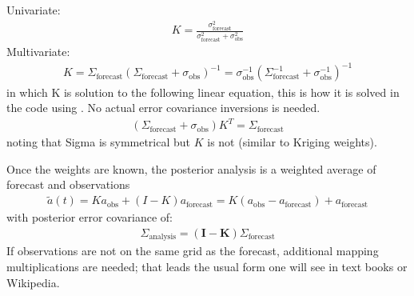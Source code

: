 \documentclass[letterpaper,10pt,english]{sphinxmanual}
\begin{document}
\sphinxAtStartPar
Univariate:
\begin{equation*}
\begin{split}K = \frac{\sigma_{\text{forecast}}^2 } { \sigma_{\text{forecast}}^2 + \sigma_{\text{obs}}^2}\end{split}
\end{equation*}
\sphinxAtStartPar
Multi\sphinxhyphen{}variate:
\begin{equation*}
\begin{split}K = \Sigma_{\text{forecast}} (\Sigma_{\text{forecast}} + \sigma_{\text{obs}})^{-1} =
\sigma_{\text{obs}}^{-1} (\Sigma_{\text{forecast}}^{-1} + \sigma_{\text{obs}}^{-1})^{-1}\end{split}
\end{equation*}
\sphinxAtStartPar
in which K is solution to the following linear equation, this is how it is solved in the code using
. No actual error covariance inversions is needed.
\begin{equation*}
\begin{split}(\Sigma_{\text{forecast}} + \sigma_{\text{obs}}) K^{T} = \Sigma_{\text{forecast}}\end{split}
\end{equation*}
\sphinxAtStartPar
noting that Sigma is symmetrical but \(K\) is not (similar to Kriging weights).

\sphinxAtStartPar
Once the weights are known, the posterior analysis is a weighted average of forecast and observations
\begin{equation*}
\begin{split}\tilde{a}(t) = K a_{\text{obs}} + (I - K)  a_{\text{forecast}} = K (a_{\text{obs}} -
a_{\text{forecast}} ) +  a_{\text{forecast}}\end{split}
\end{equation*}
\sphinxAtStartPar
with posterior error covariance of:
\begin{equation*}
\begin{split}\Sigma_{\text{analysis}} = (\textbf{I} - \textbf{K}) \Sigma_{\text{forecast}}\end{split}
\end{equation*}
\sphinxAtStartPar
If observations are not on the same grid as the forecast, additional mapping multiplications are
needed; that leads the usual form one will see in text books or Wikipedia.
\end{document}

